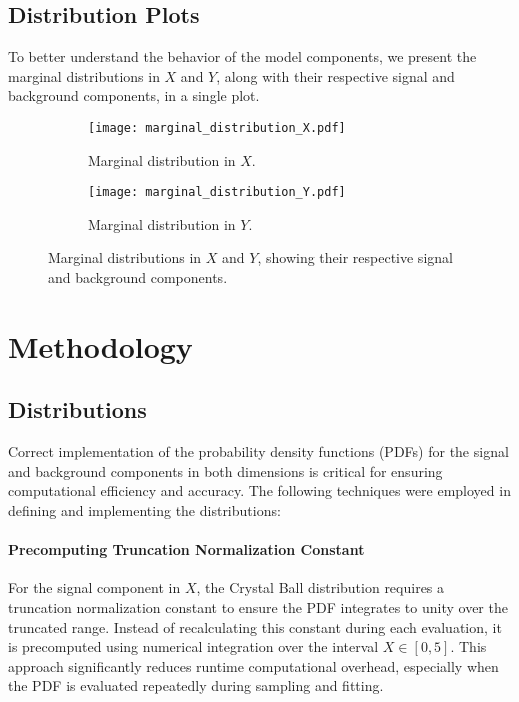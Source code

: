 \documentclass[11pt, a4paper]{article}
\begin{document}
\subsection{Distribution Plots}



To better understand the behavior of the model components, we present the marginal distributions in \(X\) and \(Y\), along with their respective signal and background components, in a single plot.
\begin{figure}[H]
    \centering
    \begin{subfigure}[b]{0.48\textwidth}
        \centering
        \texttt{[image: marginal\_distribution\_X.pdf]}
        \caption{Marginal distribution in \(X\).}
        \label{fig:marginal_X}
    \end{subfigure}
    \hfill
    \begin{subfigure}[b]{0.48\textwidth}
        \centering
        \texttt{[image: marginal\_distribution\_Y.pdf]}
        \caption{Marginal distribution in \(Y\).}
        \label{fig:marginal_Y}
    \end{subfigure}
    \caption{Marginal distributions in \(X\) and \(Y\), showing their respective signal and background components.}
    \label{fig:marginal_distributions_split}
\end{figure}


\section{Methodology}
\subsection{Distributions}

Correct implementation of the probability density functions (PDFs) for the signal and background components in both dimensions is critical for ensuring computational efficiency and accuracy. The following techniques were employed in defining and implementing the distributions:

\paragraph{Precomputing Truncation Normalization Constant}
For the signal component in \( X \), the Crystal Ball distribution requires a truncation normalization constant to ensure the PDF integrates to unity over the truncated range. Instead of recalculating this constant during each evaluation, it is precomputed using numerical integration over the interval \( X \in [0, 5] \). This approach significantly reduces runtime computational overhead, especially when the PDF is evaluated repeatedly during sampling and fitting.
\end{document}
